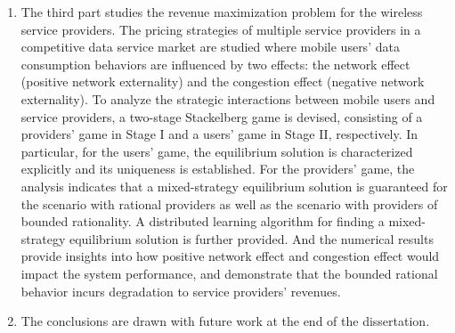 \begin{englishabstract}
\begin{enumerate}
    		\item The third part studies the revenue maximization problem for the wireless service providers. The pricing strategies of multiple service providers in a competitive data service market are studied where mobile users' data consumption behaviors are influenced by two effects: the network effect (positive network externality) and the congestion effect (negative network externality). To analyze the strategic interactions between mobile users and service providers, a two-stage Stackelberg game is devised, consisting of a providers' game in Stage I and a users' game in Stage II, respectively. In particular, for the users' game, the equilibrium solution is characterized explicitly and its uniqueness is established. For the providers' game, the analysis indicates that a mixed-strategy equilibrium solution is guaranteed for the scenario with rational providers as well as the scenario with providers of bounded rationality. A distributed learning algorithm for finding a mixed-strategy equilibrium solution is further provided. And the numerical results provide insights into how positive network effect and congestion effect would impact the system performance, and demonstrate that the bounded rational behavior incurs degradation to service providers' revenues.
    		\item The conclusions are drawn with future work at the end of the dissertation.
	\end{enumerate}


\end{englishabstract}
